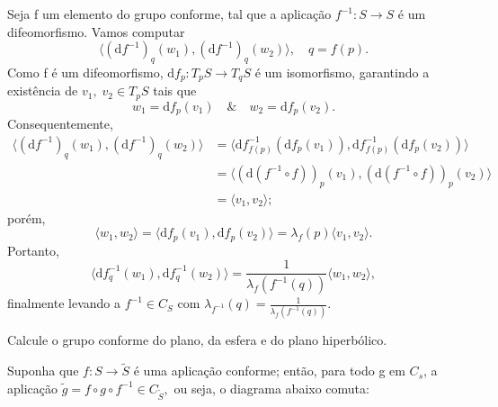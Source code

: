 \documentclass[../differential_geometry.tex]{subfiles}
\begin{document}
\begin{proof*}
	Seja f um elemento do grupo conforme, tal que a aplicação \(f^{-1}:S\rightarrow S\) é um difeomorfismo. Vamos computar
	\[
		\langle (\mathrm{d}f^{-1})_{q}(w_1), (\mathrm{d}f^{-1})_{q}(w_2)  \rangle, \quad q=f(p).
	\]
	Como f é um difeomorfismo, \(\mathrm{d}f_p:T_pS\rightarrow T_qS\) é um isomorfismo, garantindo a existência de \(v_1,\; v_2\in T_pS\) tais que
	\[
		w_1 = \mathrm{d}f_{p}(v_1) \quad\&\quad w_2 = \mathrm{d}f_p(v_2).
	\]
	Consequentemente,
	\begin{align*}
		\langle (\mathrm{d}f^{-1})_{q}(w_1), (\mathrm{d}f^{-1})_{q}(w_2) \rangle & = \langle \mathrm{d}f_{f(p)}^{-1}(\mathrm{d}f_{p}(v_1)), \mathrm{d}f_{f(p)}^{-1}(\mathrm{d}f_{p}(v_2)) \rangle \\
		                                                                         & =\langle (\mathrm{d}(f^{-1}\circ f))_{p}(v_1), (\mathrm{d}(f^{-1}\circ f))_{p}(v_2)  \rangle                   \\
		                                                                         & = \langle v_1, v_2 \rangle;
	\end{align*}
	porém,
	\[
		\langle w_1, w_2 \rangle =\langle \mathrm{d}f_{p}(v_1), \mathrm{d}f_{p}(v_2) \rangle = \lambda_{f}(p)\langle v_1, v_2 \rangle.
	\]
	Portanto,
	\[
		\langle \mathrm{d}f_{q}^{-1}(w_1), \mathrm{d}f_{q}^{-1}(w_2) \rangle = \frac{1}{\lambda_{f}(f^{-1}(q))} \langle w_1, w_2 \rangle,
	\]
	finalmente levando a \(f^{-1}\in C_{S}\) com \(\displaystyle \lambda_{f^{-1}}(q) = \frac{1}{\lambda_{f}(f^{-1}(q))}\). \qedsymbol
\end{proof*}
\begin{exr}
	Calcule o grupo conforme do plano, da esfera e do plano hiperbólico.
\end{exr}
Suponha que \(f:S\rightarrow \tilde{S}\) é uma aplicação conforme; então, para todo g em \(C_{s}\), a aplicação \(\tilde{g} = f\circ g\circ f^{-1}\in C_{\tilde{S}},\) ou seja, o diagrama abaixo comuta:
\begin{center}
\end{center}
\end{document}
